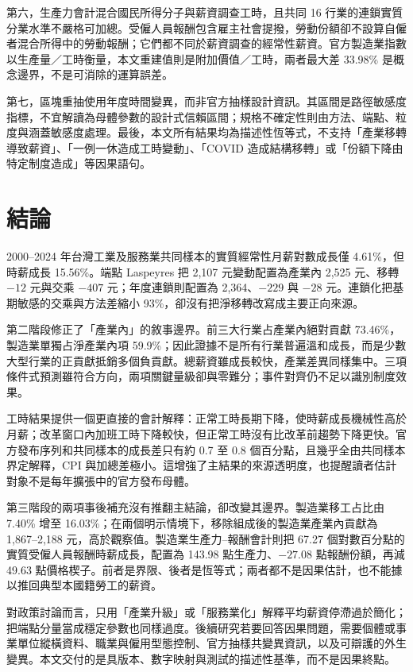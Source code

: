 \documentclass[12pt]{article}
\begin{document}
第六，生產力會計混合國民所得分子與薪資調查工時，且共同 16 行業的連鎖實質分業水準不嚴格可加總。受僱人員報酬包含雇主社會提撥，勞動份額卻不設算自僱者混合所得中的勞動報酬；它們都不同於薪資調查的經常性薪資。官方製造業指數以生產量／工時衡量，本文重建值則是附加價值／工時，兩者最大差 33.98\% 是概念邊界，不是可消除的運算誤差。

第七，區塊重抽使用年度時間變異，而非官方抽樣設計資訊。其區間是路徑敏感度指標，不宜解讀為母體參數的設計式信賴區間；規格不確定性則由方法、端點、粒度與涵蓋敏感度處理。最後，本文所有結果均為描述性恆等式，不支持「產業移轉導致薪資」、「一例一休造成工時變動」、「COVID 造成結構移轉」或「份額下降由特定制度造成」等因果語句。

\section{結論}

2000--2024 年台灣工業及服務業共同樣本的實質經常性月薪對數成長僅 4.61\%，但時薪成長 15.56\%。端點 Laspeyres 把 2,107 元變動配置為產業內 2,525 元、移轉 $-12$ 元與交乘 $-407$ 元；年度連鎖則配置為 2,364、$-229$ 與 $-28$ 元。連鎖化把基期敏感的交乘與方法差縮小 93\%，卻沒有把淨移轉改寫成主要正向來源。

第二階段修正了「產業內」的敘事邊界。前三大行業占產業內絕對貢獻 73.46\%，製造業單獨占淨產業內項 59.9\%；因此證據不是所有行業普遍溫和成長，而是少數大型行業的正貢獻抵銷多個負貢獻。總薪資雖成長較快，產業差異同樣集中。三項條件式預測雖符合方向，兩項關鍵量級卻與零難分；事件對齊仍不足以識別制度效果。

工時結果提供一個更直接的會計解釋：正常工時長期下降，使時薪成長機械性高於月薪；改革窗口內加班工時下降較快，但正常工時沒有比改革前趨勢下降更快。官方發布序列和共同樣本的成長差只有約 0.7 至 0.8 個百分點，且幾乎全由共同樣本界定解釋，CPI 與加總差極小。這增強了主結果的來源透明度，也提醒讀者估計對象不是每年擴張中的官方發布母體。

第三階段的兩項事後補充沒有推翻主結論，卻改變其邊界。製造業移工占比由 7.40\% 增至 16.03\%；在兩個明示情境下，移除組成後的製造業產業內貢獻為 1,867--2,188 元，高於觀察值。製造業生產力--報酬會計則把 67.27 個對數百分點的實質受僱人員報酬時薪成長，配置為 143.98 點生產力、$-27.08$ 點報酬份額，再減 49.63 點價格楔子。前者是界限、後者是恆等式；兩者都不是因果估計，也不能據以推回典型本國籍勞工的薪資。

對政策討論而言，只用「產業升級」或「服務業化」解釋平均薪資停滯過於簡化；把端點分量當成穩定參數也同樣過度。後續研究若要回答因果問題，需要個體或事業單位縱橫資料、職業與僱用型態控制、官方抽樣共變異資訊，以及可辯護的外生變異。本文交付的是具版本、數字映射與測試的描述性基準，而不是因果終點。
\end{document}
